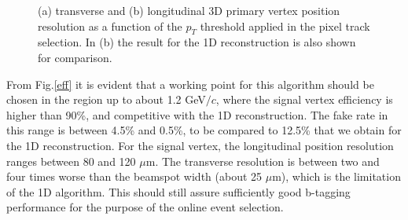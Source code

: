 \begin{figure}
   \centering
   \hspace{0.1cm}
   \caption{\small{(a) transverse and (b) longitudinal 3D primary vertex position resolution as a function of the $p_{T}$ threshold applied in the pixel track selection. In (b) the result for the 1D reconstruction is also shown for comparison.}}
   \label{res}                  %
\end{figure}
From Fig.\ref{eff} it is evident that a working point for this algorithm should be chosen in the region up to about 1.2 GeV$/c$, where the signal vertex efficiency is higher than 90\%, and competitive with the 1D reconstruction. The fake rate in this range is between 4.5\% and 0.5\%, to be compared to 12.5\% that we obtain for the 1D reconstruction. For the signal vertex, the longitudinal position resolution ranges between 80 and 120 $\mu$m. The transverse resolution is between two and four times worse than the beamspot width (about 25 $\mu$m), which is the limitation of the 1D algorithm. This should still assure sufficiently good b-tagging performance for the purpose of the online event selection. \\
